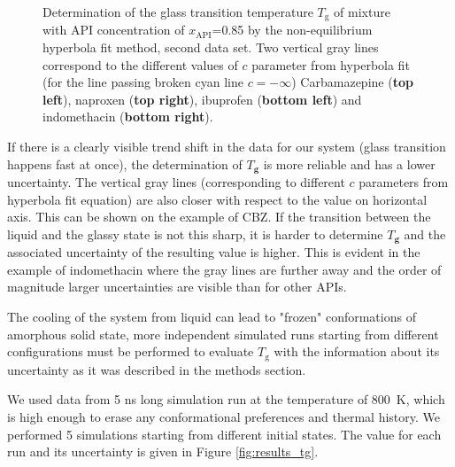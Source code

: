 \begin{figure}[H]
	\vspace{-0.2cm}
	\caption{Determination of the glass transition temperature $T_\text{g}$ of mixture with API concentration of $x_\text{API}$=0.85 by the non-equilibrium hyperbola fit method, second data set. Two vertical gray lines correspond to the different values of $c$ parameter from hyperbola fit (for the line passing broken cyan line $c=-\infty$) Carbamazepine (\textbf{top left}), naproxen (\textbf{top right}), ibuprofen (\textbf{bottom left}) and indomethacin (\textbf{bottom right}).}
	\label{fig:tg_evaluation}    
\end{figure}


If there is a clearly visible trend shift in the data for our system (glass transition happens fast at once), the determination of $T_\textbf{g}$ is more reliable and has a lower uncertainty. The vertical gray lines (corresponding to different $c$ parameters from hyperbola fit equation) are also closer with respect to the value on horizontal axis. This can be shown on the example of CBZ. If the transition between the liquid and the glassy state is not this sharp, it is harder to determine $T_\textbf{g}$ and the associated uncertainty of the resulting value is higher. This is evident in the example of indomethacin where the gray lines are further away and the order of magnitude larger uncertainties are visible than for other APIs.

The cooling of the system from liquid can lead to "frozen" conformations of amorphous solid state, more independent simulated runs starting from different configurations must be performed to evaluate $T_\text{g}$ with the information about its uncertainty as it was described in the methods section. 

We used data from 5 ns long simulation run at the temperature of 800~K, which is high enough to erase any conformational preferences and thermal history. We performed 5 simulations starting from different initial states. The value for each run and its uncertainty is given in Figure \ref{fig:results_tg}. 

